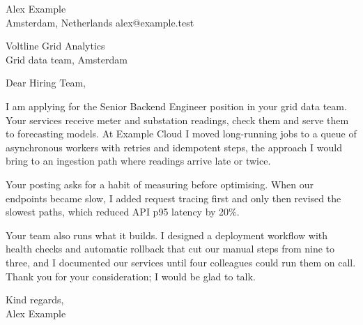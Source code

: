 \documentclass[11pt,a4paper]{article}
\begin{document}
{\large Alex Example}\\
Amsterdam, Netherlands \textperiodcentered{} alex@example.test
\bigskip

Voltline Grid Analytics\\
Grid data team, Amsterdam

Dear Hiring Team,

I am applying for the Senior Backend Engineer position in your grid data team.
Your services receive meter and substation readings, check them and serve them
to forecasting models. At Example Cloud I moved long-running jobs to a queue of
asynchronous workers with retries and idempotent steps, the approach I would
bring to an ingestion path where readings arrive late or twice.

Your posting asks for a habit of measuring before optimising. When our
endpoints became slow, I added request tracing first and only then revised the
slowest paths, which reduced API p95 latency by 20\%.

Your team also runs what it builds. I designed a deployment workflow with
health checks and automatic rollback that cut our manual steps from nine to
three, and I documented our services until four colleagues could run them on
call. Thank you for your consideration; I would be glad to talk.

Kind regards,\\
Alex Example
\end{document}
